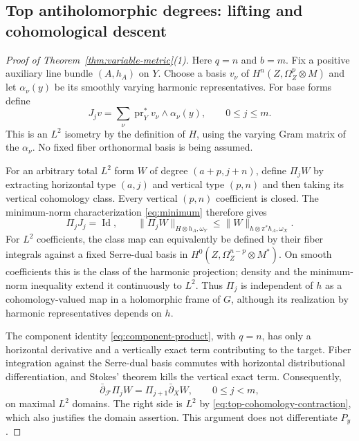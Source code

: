 \documentclass[11pt,reqno]{amsart}
\numberwithin{equation}{section}
\theoremstyle{definition}
\theoremstyle{remark}
\newcommand{\db}{\bar\partial}
\newcommand{\cF}{\mathcal F}
\newcommand{\Id}{\operatorname{Id}}
\begin{document}
\subsection{Top antiholomorphic degrees: lifting and cohomological descent}
\begin{proof}[Proof of Theorem~\ref{thm:variable-metric}(1)]
Here $q=n$ and $b=m$. Fix a positive auxiliary line bundle $(A,h_A)$ on $Y$. Choose a basis $v_\nu$ of $H^n(Z,\Omega_Z^p\otimes M)$ and let $\alpha_\nu(y)$ be its smoothly varying harmonic representatives. For base forms define
\[
 J_jv=\sum_\nu\operatorname{pr}_Y^*v_\nu\wedge\alpha_\nu(y),
 \qquad 0\leq j\leq m.
\]
This is an $L^2$ isometry by the definition of $H$, using the varying Gram matrix of the $\alpha_\nu$. No fixed fiber orthonormal basis is being assumed.

For an arbitrary total $L^2$ form $W$ of degree $(a+p,j+n)$, define $\Pi_jW$ by extracting horizontal type $(a,j)$ and vertical type $(p,n)$ and then taking its vertical cohomology class. Every vertical $(p,n)$ coefficient is closed. The minimum-norm characterization \eqref{eq:minimum} therefore gives
\begin{equation}\label{eq:top-cohomology-contraction}
 \Pi_jJ_j=\Id,\qquad
 \|\Pi_jW\|_{H\otimes h_A,\omega_Y}\leq
       \|W\|_{h\otimes\pi^*h_A,\omega_X}.
\end{equation}
For $L^2$ coefficients, the class map can equivalently be defined by their fiber integrals against a fixed Serre-dual basis in $H^0(Z,\Omega_Z^{n-p}\otimes M^*)$. On smooth coefficients this is the class of the harmonic projection; density and the minimum-norm inequality extend it continuously to $L^2$. Thus $\Pi_j$ is independent of $h$ as a cohomology-valued map in a holomorphic frame of $G$, although its realization by harmonic representatives depends on $h$.

The component identity \eqref{eq:component-product}, with $q=n$, has only a horizontal derivative and a vertically exact term contributing to the target. Fiber integration against the Serre-dual basis commutes with horizontal distributional differentiation, and Stokes' theorem kills the vertical exact term. Consequently,
\begin{equation}\label{eq:top-cohomology-chain}
 \db_{\cF}\Pi_jW=\Pi_{j+1}\db_XW,\qquad 0\leq j<m,
\end{equation}
on maximal $L^2$ domains. The right side is $L^2$ by \eqref{eq:top-cohomology-contraction}, which also justifies the domain assertion. This argument does not differentiate $P_y$.


\end{proof}
\end{document}
